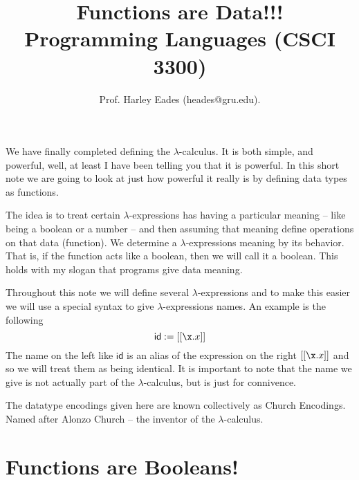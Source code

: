 \documentclass{article}
\title{Functions are Data!!!\\Programming Languages (CSCI 3300)\vspace{-22px}}
\author{Prof. Harley Eades (heades@gru.edu).}
\date{\vspace{-22px}}
\begin{document}
\maketitle  

We have finally completed defining the $\lambda$-calculus.  It is both
simple, and powerful, well, at least I have been telling you that it
is powerful.  In this short note we are going to look at just how
powerful it really is by defining data types as functions.

The idea is to treat certain $\lambda$-expressions has having a
particular meaning -- like being a boolean or a number -- and then
assuming that meaning define operations on that data (function).  We
determine a $\lambda$-expressions meaning by its behavior.  That is,
if the function acts like a boolean, then we will call it a boolean.
This holds with my slogan that programs give data meaning.

Throughout this note we will define several $\lambda$-expressions and
to make this easier we will use a special syntax to give
$\lambda$-expressions names.  An example is the following \[
\mathsf{id} := [[\x.x]] \] The name on the left like $\mathsf{id}$ is
an alias of the expression on the right $[[\x.x]]$ and so we will
treat them as being identical.  It is important to note that the name
we give is not actually part of the $\lambda$-calculus, but is just
for connivence.

The datatype encodings given here are known collectively as Church
Encodings.  Named after Alonzo Church -- the inventor of the
$\lambda$-calculus.

\section{Functions are Booleans!}
\label{sec:functions_are_booleans!}
\end{document}
